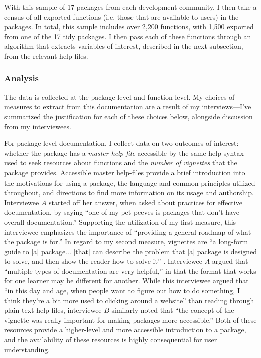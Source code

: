 With this sample of 17 packages from each development community, I then take a census of all exported functions (i.e. those that are available to users) in the packages. In total, this sample includes over 2,200 functions, with 1,500 exported from one of the 17 tidy packages. I then pass each of these functions through an algorithm that extracts variables of interest, described in the next subsection, from the relevant help-files.

\subsubsection{Analysis} \label{sec:met-analyze} \hspace{10pt} The data is collected at the package-level and function-level. My choices of measures to extract from this documentation are a result of my interviews---I've summarized the justification for each of these choices below, alongside discussion from my interviewees.

For package-level documentation, I collect data on two outcomes of interest: whether the package has a \textit{master help-file} accessible by the same help syntax used to seek resources about functions and the \textit{number of vignettes} that the package provides. Accessible master help-files provide a brief introduction into the motivations for using a package, the language and common principles utilized throughout, and directions to find more information on its usage and authorship. Interviewee $A$ started off her answer, when asked about practices for effective documentation, by saying ``one of my pet peeves is packages that don’t have overall documentation.'' Supporting the utilization of my first measure, this interviewee emphasizes the importance of ``providing a general roadmap of what the package is for.'' In regard to my second measure, vignettes are ``a long-form guide to [a] package... [that] can describe the problem that [a] package is designed to solve, and then show the reader how to solve it'' \cite{wickham2015r}. Interviewee $A$ argued that ``multiple types of documentation are very helpful,'' in that the format that works for one learner may be different for another. While this interviewee argued that ``in this day and age, when people want to figure out how to do something, I think they’re a bit more used to clicking around a website'' than reading through plain-text help-files, interviewee $B$ similarly noted that ``the concept of the vignette was really important for making packages more accessible.'' Both of these resources provide a higher-level and more accessible introduction to a package, and the availability of these resources is highly consequential for user understanding.

